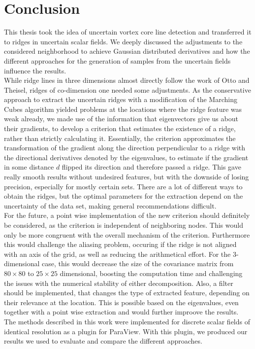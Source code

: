 \chapter{Conclusion}\label{chap:Discu}

This thesis took the idea of uncertain vortex core line detection and
transferred it to ridges in uncertain scalar fields. We deeply discussed
the adjustments to the considered neighborhood to achieve Gaussian
distributed derivatives and how the different approaches for the
generation of samples from the uncertain fields influence the results.\\
\indent While ridge lines in three dimensions almost directly follow the
work of Otto and Theisel, ridges of co-dimension one needed some
adjustments. As the conservative approach to extract the uncertain
ridges with a modification of the Marching Cubes algorithm yielded
problems at the locations where the ridge feature was weak already, we
made use of the information that eigenvectors give us about their
gradients, to develop a criterion that estimates the existence of a
ridge, rather than strictly calculating it. Essentially, the criterion
approximates the transformation of the gradient along the direction
perpendicular to a ridge with the directional derivatives denoted by the
eigenvalues, to estimate if the gradient in some distance $d$ flipped
its direction and therefore passed a ridge. This gave really smooth
results without undesired features, but with the downside of losing
precision, especially for mostly certain sets. There are a lot of
different ways to obtain the ridges, but the optimal parameters for the
extraction depend on the uncertainty of the data set, making general
recommendations difficult.\\
\indent For the future, a point wise implementation of the new criterion
should definitely be considered, as the criterion is independent of
neighboring nodes. This would only be more congruent with the overall
mechanism of the criterion. Furthermore this would challenge the
aliasing problem, occuring if the ridge is not aligned with an axis of
the grid, as well as reducing the arithmetical effort. For the
3-dimensional case, this would decrease the size of the covariance
matrix from $80 \times 80$ to $25 \times 25$ dimensional, boosting the
computation time and challenging the issues with the numerical stability
of either decomposition. Also, a filter should be implemented, that
changes the type of extracted feature, depending on their relevance at
the location. This is possible based on the eigenvalues, even together
with a point wise extraction and would further improove the results.\\
\indent The methods described in this work were implemented for discrete
scalar fields of identical resolution as a plugin for ParaView. With
this plugin, we produced our results we used to evaluate and compare
the different approaches.
